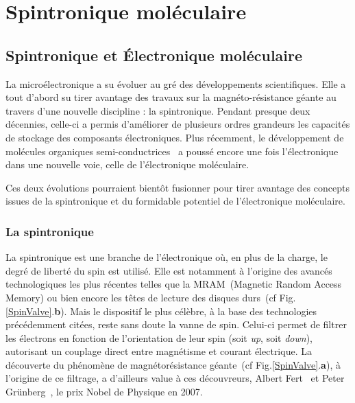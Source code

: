 \chapter{Spintronique moléculaire}

\section{Spintronique et Électronique moléculaire}
La microélectronique a su évoluer au gré des développements scientifiques. Elle a tout d'abord su tirer avantage des travaux sur la magnéto-résistance géante au travers d'une nouvelle discipline : la spintronique. Pendant presque deux décennies, celle-ci a permis d'améliorer de plusieurs ordres grandeurs les capacités de stockage des composants électroniques. Plus récemment, le développement de molécules organiques semi-conductrices~\cite{Tsumura1986,Horowitz1990,Lin1997} a poussé encore une fois l'électronique dans une nouvelle voie, celle de l'électronique moléculaire.

Ces deux évolutions pourraient bientôt fusionner pour tirer avantage des concepts issues de la spintronique et du formidable potentiel de l'électronique moléculaire.

\subsection{La spintronique}
La spintronique est une branche de l'électronique où, en plus de la charge, le degré de liberté du spin est utilisé. Elle est notamment à l'origine des avancés technologiques les plus récentes telles que la MRAM~(Magnetic Random Access Memory) ou bien encore les têtes de lecture des disques durs~(cf Fig.\ref{SpinValve}.\textbf{b}). Mais le dispositif le plus célèbre, à la base des technologies précédemment citées, reste sans doute la vanne de spin. Celui-ci permet de filtrer les électrons en fonction de l'orientation de leur spin (soit \textit{up}, soit \textit{down}), autorisant un couplage direct entre magnétisme et courant électrique. La découverte du phénomène de magnétorésistance géante~(cf Fig.\ref{SpinValve}.\textbf{a}), à l'origine de ce filtrage, a d'ailleurs value à ces découvreurs, Albert Fert~\cite{Baibich1988} et Peter Grünberg~\cite{Gruenberg1986}, le prix Nobel de Physique en 2007.

